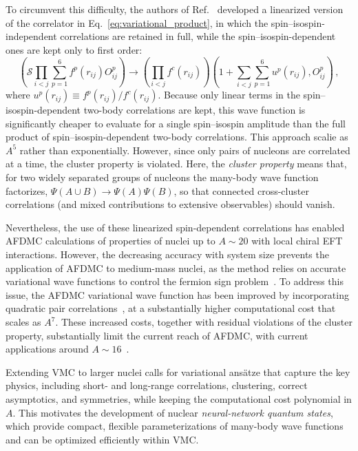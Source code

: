 To circumvent this difficulty, the authors of Ref.~\cite{gandolfi2014} developed a linearized version of the correlator in Eq.~\eqref{eq:variational_product}, in which the spin--isospin-independent correlations are retained in full, while the spin--isospin-dependent ones are kept only to first order:
\begin{equation}
\left(\mathcal{S}\prod_{i<j}\sum_{p=1}^{6} f^{p}(r_{ij})O^{p}_{ij}\right)
\longrightarrow
\left(\prod_{i<j} f^{c}(r_{ij})\right)
\left(1+\sum_{i<j}\sum_{p=1}^{6} u^{p}(r_{ij}),O^{p}_{ij}\right)\,,
\label{eq:variational_linear}
\end{equation}
where $u^{p}(r_{ij}) \equiv f^{p}(r_{ij})/f^{c}(r_{ij})$. Because only linear terms in the spin--isospin-dependent two-body correlations are kept, this wave function is significantly cheaper to evaluate for a single spin--isospin amplitude than the full product of spin--isospin-dependent two-body correlations. This approach scalie as $A^{5}$ rather than exponentially. However, since only pairs of nucleons are correlated at a time, the cluster property is violated. Here, the \emph{cluster property} means that, for two widely separated groups of nucleons the many-body wave function factorizes, $\Psi(A\cup B)\to\Psi(A)\Psi(B)$, so that connected cross-cluster correlations (and mixed contributions to extensive observables) should vanish.

Nevertheless, the use of these linearized spin-dependent correlations has enabled AFDMC calculations of properties of nuclei up to $A\sim 20$ with local chiral EFT interactions. However, the decreasing accuracy with system size prevents the application of AFDMC to medium-mass nuclei, as the method relies on accurate variational wave functions to control the fermion sign problem~\cite{piarulli_benchmark_2020}. To address this issue, the AFDMC variational wave function has been improved by incorporating quadratic pair correlations~\cite{lonardoni_auxiliary_2018}, at a substantially higher computational cost that scales as $A^{7}$. These increased costs, together with residual violations of the cluster property, substantially limit the current reach of AFDMC, with current applications around $A \sim 16$~\cite{novario_trends_2023,martin_auxiliary_2023}.


Extending VMC to larger nuclei calls for variational ans\"atze that capture the key physics, including short- and long-range correlations, clustering, correct asymptotics, and symmetries, while keeping the computational cost polynomial in $A$. This motivates the development of nuclear \emph{neural-network quantum states}, which provide compact, flexible parameterizations of many-body wave functions and can be optimized efficiently within VMC.

